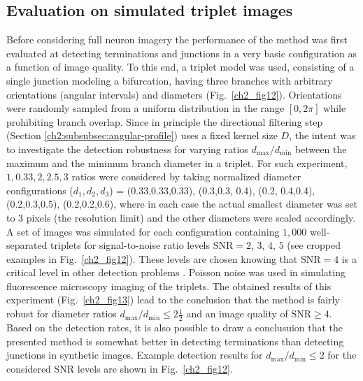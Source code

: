 \subsection{Evaluation on simulated triplet images}
\label{ch2:subsec:experiments-triplets}
Before considering full neuron imagery the performance of the method was first evaluated at detecting terminations and junctions in a very basic configuration as a function of image quality. To this end, a triplet model was used, consisting of a single junction modeling a bifurcation, having three branches with arbitrary orientations (angular intervals) and diameters (Fig.~\ref{ch2_fig12}). Orientations were randomly sampled from a uniform distribution in the range $[0, 2\pi]$ while prohibiting branch overlap. Since in principle the directional filtering step (Section \ref{ch2:subsubsec:angular-profile}) uses a fixed kernel size $D$, the intent was to investigate the detection robustness for varying ratios $d_{\max}/d_{\min}$ between the maximum and the minimum branch diameter in a triplet. For such experiment, $1,0.33,2,2.5,3$ ratios were considered by taking normalized diameter configurations ($d_1,d_2,d_3$) = (0.33,0.33,0.33), (0.3,0.3, 0.4), (0.2, 0.4,0.4), (0.2,0.3,0.5), (0.2,0.2,0.6), where in each case the actual smallest diameter was set to 3 pixels (the resolution limit) and the other diameters were scaled accordingly. A set of images was simulated for each configuration containing $1,000$ well-separated triplets for signal-to-noise ratio levels $\textrm{SNR}=2$, $3$, $4$, $5$ (see cropped examples in Fig.~\ref{ch2_fig12}). These levels are chosen knowing that $\textrm{SNR}=4$ is a critical level in other detection problems \cite{smal2010quantitative, chenouard2014objective}. Poisson noise was used in simulating fluorescence microscopy imaging of the triplets. The obtained results of this experiment (Fig.~\ref{ch2_fig13}) lead to the conclusion that the method is fairly robust for diameter ratios $d_{\max}/d_{\min}\leq2\frac{1}{2}$ and an image quality of $\textrm{SNR} \geq 4$. Based on the detection rates, it is also possible to draw a conclusuion that the presented method is somewhat better in detecting terminations than detecting junctions in synthetic images. Example detection results for $d_{\max}/d_{\min}\leq2$ for the considered SNR levels are shown in Fig.~\ref{ch2_fig12}.

